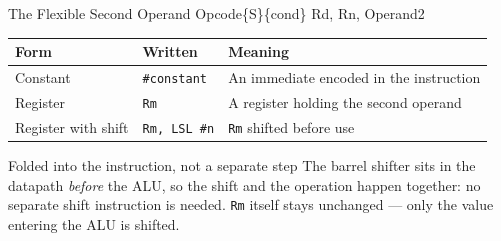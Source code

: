\documentclass[9pt,aspectratio=169,xcolor=table]{beamer}
\begin{document}
\begin{frame}[fragile]{The Flexible Second Operand}
	\leavevmode
	{\ttfamily\large Opcode\{S\}\{cond\} \quad Rd, \quad Rn, \quad Operand2}

	\vspace{2mm}
	\begin{center}
		{\small
			\striped
			\begin{tabular}{@{}l l R{.44\textwidth}@{}}
				\toprule
				\textbf{Form} & \textbf{Written} & \textbf{Meaning} \\
				\midrule
				Constant & \texttt{\#constant} & An immediate encoded in the instruction \\
				Register & \texttt{Rm} & A register holding the second operand \\
				Register with shift & \texttt{Rm, LSL \#n} & \texttt{Rm} shifted before use \\
				\bottomrule
		\end{tabular}}
	\end{center}

	\vspace{2mm}

	\vspace{2mm}
	\begin{block}{Folded into the instruction, not a separate step}
		{\small The \alert{barrel shifter} sits in the datapath \emph{before}
			the ALU, so the shift and the operation happen together: no
			separate shift instruction is needed. \texttt{Rm} itself stays
			\alert{unchanged} --- only the value entering the ALU is
			shifted.}
	\end{block}
\end{frame}


\end{document}
